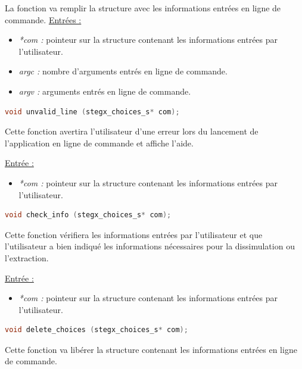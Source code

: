 \documentclass[11pt]{article}
\begin{document}
La fonction va remplir la structure avec les informations entrées en 
ligne de commande. 
\newline
\underline{Entrées :} 
\begin{itemize}
\item \textit{*com :} pointeur sur la structure contenant les informations 
entrées par l'utilisateur. 
\item \textit{argc :} nombre d'arguments entrés en ligne de commande. 
\item \textit{argv :} arguments entrés en ligne de commande. 
\newline 
\end{itemize}

\begin{lstlisting}[language=c]
void unvalid_line (stegx_choices_s* com);
\end{lstlisting}

Cette fonction avertira l'utilisateur d'une erreur lors du lancement 
de l'application en ligne de commande et affiche l'aide. \newline

\underline{Entrée :} 
\begin{itemize}
\item \textit{*com :} pointeur sur la structure contenant les informations 
entrées par l'utilisateur. 
\newline 
\end{itemize}

\begin{lstlisting}[language=c]
void check_info (stegx_choices_s* com);
\end{lstlisting}

Cette fonction vérifiera les informations entrées par l'utilisateur et 
que l'utilisateur a bien indiqué les informations nécessaires pour 
la dissimulation ou l'extraction. \newline

\underline{Entrée :} 
\begin{itemize}
\item \textit{*com :} pointeur sur la structure contenant les informations 
entrées par l'utilisateur. 
\newline 
\end{itemize}

\begin{lstlisting}[language=c]
void delete_choices (stegx_choices_s* com);
\end{lstlisting}

Cette fonction va libérer la structure contenant les informations entrées 
en ligne de commande. \newline
\end{document}
